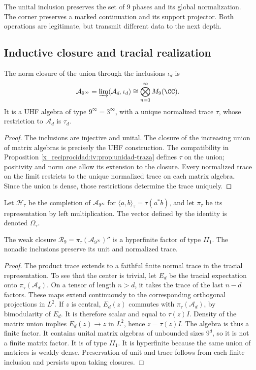 The unital inclusion preserves the set of \(9\) phases and its
global normalization. The corner preserves a marked continuation and
its support projector. Both operations are legitimate, but
transmit different data to the next depth.

\subsection{Inductive closure and tracial realization}

\begin{theorem}
\label{x_reciprocidad:iv:thm:uhf}
The norm closure of the union through the inclusions \(\iota_d\)
is
\[
 \mathcal A_{9^\infty}
 =\varinjlim(\mathcal A_d,\iota_d)
 \cong\bigotimes_{n=1}^{\infty}M_9(\CC).
\]
It is a UHF algebra of type \(9^\infty=3^\infty\), with a unique
normalized trace \(\tau\), whose restriction to \(\mathcal A_d\)
is \(\tau_d\).
\end{theorem}
\begin{proof}
The inclusions are injective and unital. The closure of the increasing
union of matrix algebras is precisely the UHF construction.
The compatibility in Proposition \ref{x_reciprocidad:iv:prop:unidad-traza}
defines \(\tau\) on the union; positivity and norm one allow
its extension to the closure. Every normalized trace on the limit restricts
to the unique normalized trace on each matrix algebra. Since the union
is dense, those restrictions determine the trace uniquely.
\end{proof}

Let \(\mathcal H_\tau\) be the completion of
\(\mathcal A_{9^\infty}\) for
\(\langle a,b\rangle_\tau=\tau(a^*b)\), and let \(\pi_\tau\)
be its representation by left multiplication. The vector defined
by the identity is denoted \(\Omega_\tau\).

\begin{theorem}
\label{x_reciprocidad:iv:thm:factor-tracial}
The weak closure
\(\mathcal R_9=\pi_\tau(\mathcal A_{9^\infty})''\)
is a hyperfinite factor of type \(II_1\). The nonadic
inclusions preserve its unit and normalized trace.
\end{theorem}
\begin{proof}
The product trace extends to a faithful finite normal trace
in the tracial representation. To see that the center is trivial,
let \(E_d\) be the tracial expectation onto \(\pi_\tau(\mathcal A_d)\).
On a tensor of length \(n>d\), it takes the trace of the last
\(n-d\) factors. These maps extend continuously
to the corresponding orthogonal projections in \(L^2\).
If \(z\) is central, \(E_d(z)\) commutes with
\(\pi_\tau(\mathcal A_d)\), by bimodularity of \(E_d\).
It is therefore scalar and equal to \(\tau(z)I\). Density of the
matrix union implies \(E_d(z)\to z\) in \(L^2\), hence
\(z=\tau(z)I\). The algebra is thus a finite factor.
It contains unital matrix algebras of unbounded sizes \(9^d\),
so it is not a finite matrix factor. It is of type \(II_1\).
It is hyperfinite because the same union of matrices is weakly
dense. Preservation of unit and trace follows from each finite
inclusion and persists upon taking closures.
\end{proof}

